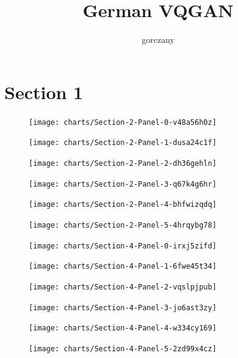 \documentclass{article}
\title{German VQGAN}
\author{%
gorczany
}
\begin{document}
\maketitle

\section{Section 1}

\begin{figure}[!htb]
\texttt{[image: charts/Section-2-Panel-0-v48a56h0z]}
\caption{}
\endminipage\hfill
{}
\texttt{[image: charts/Section-2-Panel-1-dusa24c1f]}
\caption{}
\endminipage
\end{figure}

\begin{figure}[!htb]
\texttt{[image: charts/Section-2-Panel-2-dh36gehln]}
\caption{}
\endminipage\hfill
{}
\texttt{[image: charts/Section-2-Panel-3-q67k4g6hr]}
\caption{}
\endminipage
\end{figure}

\begin{figure}[!htb]
\texttt{[image: charts/Section-2-Panel-4-bhfwizqdq]}
\caption{}
\endminipage\hfill
{}
\texttt{[image: charts/Section-2-Panel-5-4hrqybg78]}
\caption{}
\endminipage
\end{figure}

\begin{figure}[!htb]
\texttt{[image: charts/Section-4-Panel-0-irxj5zifd]}
\caption{}
\endminipage\hfill
{}
\texttt{[image: charts/Section-4-Panel-1-6fwe45t34]}
\caption{}
\endminipage
\end{figure}

\begin{figure}[!htb]
\texttt{[image: charts/Section-4-Panel-2-vqslpjpub]}
\caption{}
\endminipage\hfill
{}
\texttt{[image: charts/Section-4-Panel-3-jo6ast3zy]}
\caption{}
\endminipage
\end{figure}

\begin{figure}[!htb]
\texttt{[image: charts/Section-4-Panel-4-w334cy169]}
\caption{}
\endminipage\hfill
{}
\texttt{[image: charts/Section-4-Panel-5-2zd99x4cz]}
\caption{}
\endminipage
\end{figure}
\end{document}
